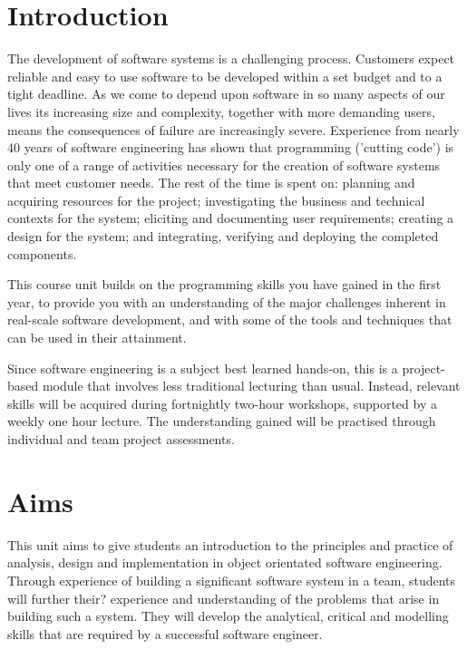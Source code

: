 \section*{Introduction}

The development of software systems is a challenging process. Customers expect
reliable and easy to use software to be developed within a set budget and to a
tight deadline. As we come to depend upon software in so many aspects of our
lives its increasing size and complexity, together with more demanding users,
means the consequences of failure are increasingly severe. Experience from
nearly 40 years of software engineering has shown that programming ('cutting
code') is only one of a range of activities necessary for the creation of
software systems that meet customer needs. The rest of the time is spent on:
planning and acquiring resources for the project; investigating the business
and technical contexts for the system; eliciting and documenting user
requirements; creating a design for the system; and integrating, verifying and
deploying the completed components.

This course unit builds on the programming skills you have gained in the first
year, to provide you with an understanding of the major challenges inherent in
real-scale software development, and with some of the tools and techniques
that can be used in their attainment.

Since software engineering is a subject best learned hands-on, this is a
project-based module that involves less traditional lecturing than usual.
Instead, relevant skills will be acquired during fortnightly two-hour
workshops, supported by a weekly one hour lecture. The understanding gained
will be practised through individual and team project assessments.

\section*{Aims}

This unit aims to give students an introduction to the principles and practice
of analysis, design and implementation in object orientated software
engineering. Through experience of building a significant software system in a
team, students will further their? experience and understanding of the
problems that arise in building such a system. They will develop the
analytical, critical and modelling skills that are required by a successful
software engineer.
